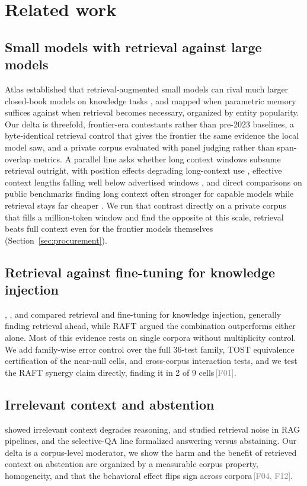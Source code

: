 \documentclass[11pt]{article}
\newcommand{\rcpt}[1]{\textcolor{gray}{\,\textsf{\scriptsize[#1]}}}
\begin{document}
\section{Related work}
\label{sec:related}

\subsection{Small models with retrieval against large models}
Atlas established that retrieval-augmented small models can rival much larger closed-book models on knowledge tasks \citep{izacard2023atlas}, and \citet{mallen2023trust} mapped when parametric memory suffices against when retrieval becomes necessary, organized by entity popularity. Our delta is threefold, frontier-era contestants rather than pre-2023 baselines, a byte-identical retrieval control that gives the frontier the same evidence the local model saw, and a private corpus evaluated with panel judging rather than span-overlap metrics. A parallel line asks whether long context windows subsume retrieval outright, with position effects degrading long-context use \citep{liu2024lost}, effective context lengths falling well below advertised windows \citep{hsieh2024ruler}, and direct comparisons on public benchmarks finding long context often stronger for capable models while retrieval stays far cheaper \citep{li2024ragvslong}. We run that contrast directly on a private corpus that fills a million-token window and find the opposite at this scale, retrieval beats full context even for the frontier models themselves (Section~\ref{sec:procurement}).

\subsection{Retrieval against fine-tuning for knowledge injection}
\citet{ovadia2023finetuning}, \citet{balaguer2024rag}, and \citet{soudani2024finetuning} compared retrieval and fine-tuning for knowledge injection, generally finding retrieval ahead, while RAFT \citep{zhang2024raft} argued the combination outperforms either alone. Most of this evidence rests on single corpora without multiplicity control. We add family-wise error control over the full 36-test family, TOST equivalence certification of the near-null cells, and cross-corpus interaction tests, and we test the RAFT synergy claim directly, finding it in 2 of 9 cells\rcpt{F01}.

\subsection{Irrelevant context and abstention}
\citet{shi2023distracted} showed irrelevant context degrades reasoning, \citet{cuconasu2024noise} and \citet{yoran2024irrelevant} studied retrieval noise in RAG pipelines, and the selective-QA line \citep{rajpurkar2018squad2, kamath2020selective} formalized answering versus abstaining. Our delta is a corpus-level moderator, we show the harm and the benefit of retrieved context on abstention are organized by a measurable corpus property, homogeneity, and that the behavioral effect flips sign across corpora\rcpt{F04, F12}.
\end{document}
